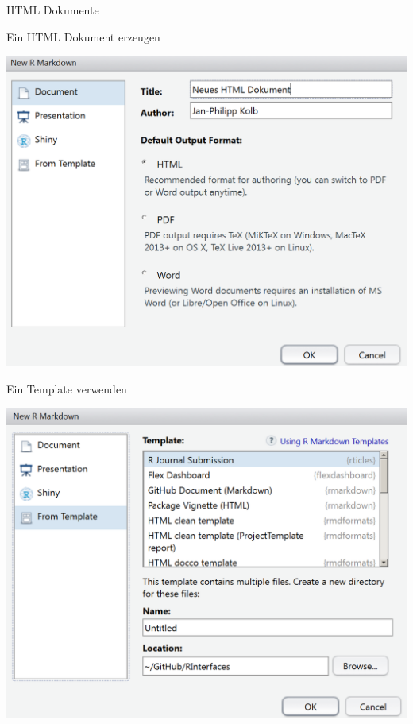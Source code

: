 \documentclass[ignorenonframetext,]{beamer}
\begin{document}
\begin{frame}[fragile]{HTML Dokumente}

\begin{block}{Ein HTML Dokument erzeugen}

\includegraphics{./tex2pdf.9796/31d4b4586dab4643e4d8b883abf882d5ff8fe3f6.png}

\end{block}

\begin{block}{Ein Template verwenden}

\includegraphics{./tex2pdf.9796/1771b95da3be53fc31af968ebd1ed9e363cf9d6c.png}


\end{block}
\end{frame}
\end{document}
